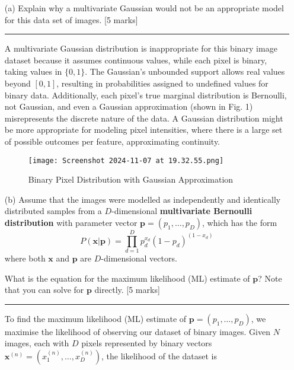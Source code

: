\documentclass{article}
\begin{document}
\begin{enumerate}
    \item[(a)] Explain why a multivariate Gaussian would not be an appropriate model for this data set of images. [5 marks]
    
    \noindent\textcolor{gray}{\rule{0.1\linewidth}{0.4pt}}
    \vspace{10pt}
    
    A multivariate Gaussian distribution is inappropriate for this binary image dataset because it assumes continuous values, while each pixel is binary, taking values in \(\{0, 1\}\). The Gaussian's unbounded support allows real values beyond \([0, 1]\), resulting in probabilities assigned to undefined values for binary data. Additionally, each pixel’s true marginal distribution is Bernoulli, not Gaussian, and even a Gaussian approximation (shown in Fig. 1) misrepresents the discrete nature of the data. A Gaussian distribution might be more appropriate for modeling pixel intensities, where there is a large set of possible outcomes per feature, approximating continuity.

    \begin{figure}[H]
        \centering
        \texttt{[image: Screenshot 2024-11-07 at 19.32.55.png]}
        \caption{Binary Pixel Distribution with Gaussian Approximation}
        \label{fig:enter-label}
    \end{figure}
    
    \item[(b)] Assume that the images were modelled as independently and identically distributed samples from a $D$-dimensional \textbf{multivariate Bernoulli distribution} with parameter vector $\mathbf{p} = (p_1, \dots, p_D)$, which has the form
    \[
    P(\mathbf{x} | \mathbf{p}) = \prod_{d=1}^D p_d^{x_d}(1 - p_d)^{(1 - x_d)}
    \]
    where both $\mathbf{x}$ and $\mathbf{p}$ are $D$-dimensional vectors.
    
    What is the equation for the maximum likelihood (ML) estimate of $\mathbf{p}$? Note that you can solve for $\mathbf{p}$ directly. [5 marks]
    
    \vspace{10pt}
    \noindent\textcolor{gray}{\rule{0.1\linewidth}{0.4pt}}

    To find the maximum likelihood (ML) estimate of \(\mathbf{p} = (p_1, \ldots, p_D)\), we maximise the likelihood of observing our dataset of binary images. Given \(N\) images, each with \(D\) pixels represented by binary vectors \(\mathbf{x}^{(n)} = (x_1^{(n)}, \ldots, x_D^{(n)})\), the likelihood of the dataset is
    

\end{enumerate}
\end{document}
